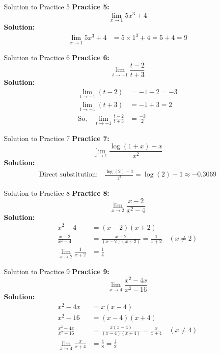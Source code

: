 \documentclass[aspectratio=169]{beamer}
\begin{document}
\begin{frame}{Solution to Practice 5}
\textbf{Practice 5:}
\[
\lim_{x \to 1} 5x^3 + 4
\]
\textbf{Solution:}
\begin{align*}
\lim_{x \to 1} 5x^3 + 4 &= 5\times 1^3 + 4 = 5+4 = 9
\end{align*}
\end{frame}

\begin{frame}{Solution to Practice 6}
\textbf{Practice 6:}
\[
\lim_{t \to -1} \frac{t-2}{t+3}
\]
\textbf{Solution:}
\begin{align*}
\lim_{t \to -1} (t-2) &= -1-2 = -3 \\
\lim_{t \to -1} (t+3) &= -1+3 = 2 \\
\text{So,}\quad \lim_{t \to -1} \frac{t-2}{t+3} &= \frac{-3}{2}
\end{align*}
\end{frame}

\begin{frame}{Solution to Practice 7}
\textbf{Practice 7:}
\[
\lim_{x \to 1} \frac{\log(1+x)-x}{x^2}
\]
\textbf{Solution:}
\begin{align*}
\text{Direct substitution:}\quad \frac{\log(2)-1}{1^2} = \log(2)-1 \approx -0.3069
\end{align*}
\end{frame}

\begin{frame}{Solution to Practice 8}
\textbf{Practice 8:}
\[
\lim_{x \to 2} \frac{x-2}{x^2-4}
\]
\textbf{Solution:}
\begin{align*}
x^2-4 &= (x-2)(x+2) \\
\frac{x-2}{x^2-4} &= \frac{x-2}{(x-2)(x+2)} = \frac{1}{x+2} \quad (x \neq 2) \\
\lim_{x \to 2} \frac{1}{x+2} &= \frac{1}{4}
\end{align*}
\end{frame}

\begin{frame}{Solution to Practice 9}
\textbf{Practice 9:}
\[
\lim_{x \to 4} \frac{x^2-4x}{x^2-16}
\]
\textbf{Solution:}
\begin{align*}
x^2-4x &= x(x-4) \\
x^2-16 &= (x-4)(x+4) \\
\frac{x^2-4x}{x^2-16} &= \frac{x(x-4)}{(x-4)(x+4)} = \frac{x}{x+4} \quad (x \neq 4) \\
\lim_{x \to 4} \frac{x}{x+4} &= \frac{4}{8} = \frac{1}{2}
\end{align*}
\end{frame}
\end{document}
